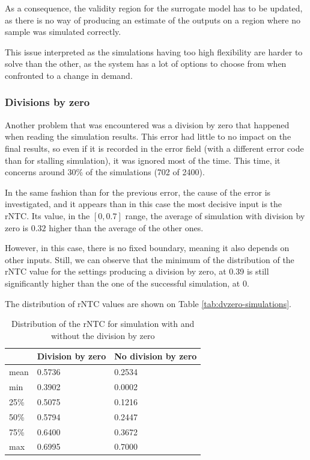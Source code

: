 As a consequence, the validity region for the surrogate model has to be updated, as there is no way of producing an estimate of the outputs on a region where no sample was simulated correctly.

This issue interpreted as the simulations having too high flexibility are harder to solve than the other, as the system has a lot of options to choose from when confronted to a change in demand.

\subsubsection{Divisions by zero}

Another problem that was encountered was a division by zero that happened when reading the simulation results. This error had little to no impact on the final results, so even if it is recorded in the error field (with a different error code than for stalling simulation), it was ignored most of the time. This time, it concerns around 30\% of the simulations (702 of 2400).

In the same fashion than for the previous error, the cause of the error is investigated, and it appears than in this case the most decisive input is the rNTC. Its value, in the $[0, 0.7]$ range, the average of simulation with division by zero is $0.32$ higher than the average of the other ones. 

However, in this case, there is no fixed boundary, meaning it also depends on other inputs. Still, we can observe that the minimum of the distribution of the rNTC value for the settings producing a division by zero, at 0.39 is still significantly higher than the one of the successful simulation, at 0. 

The distribution of rNTC values are shown on Table \ref{tab:dvzero-simulations}.

\begin{table}
    \centering
    \begin{tabular}{|l|ll|}
        \hline
        & Division by zero & No division by zero \\ \hline
        mean & 0.5736 & 0.2534 \\
        min  & 0.3902 & 0.0002 \\
        25\% & 0.5075 & 0.1216 \\
        50\% & 0.5794 & 0.2447 \\
        75\% & 0.6400 & 0.3672 \\
        max  & 0.6995 & 0.7000 \\ \hline
    \end{tabular}
    \caption{Distribution of the rNTC for simulation with and without the division by zero}
    \label{tab:divzero-simulations}
\end{table}

